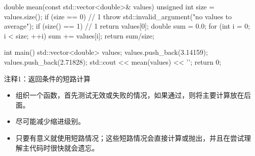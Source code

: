 
\begin{cpp}
double mean(const std::vector<double>& values) {
  unsigned int size = values.size();
  if (size == 0) // 1
    throw std::invalid_argument("no values to average");
  if (size() == 1) // 1
    return values[0];
  double sum = 0.0;
  for (int i = 0; i < size; ++i)
    sum += values[i];
  return sum/size;
}

int main() {
  std::vector<double> values;
  values.push_back(3.14159);
  values.push_back(2.71828);
  std::cout << mean(values) << '\n';
  return 0;
}
\end{cpp}

{\footnotesize
注释1：返回条件的短路计算
}


\begin{itemize}
\item
组织一个函数，首先测试无效或失败的情况，如果通过，则将主要计算放在后面。

\item
尽可能减少缩进级别。

\item
只要有意义就使用短路情况；这些短路情况会直接计算或抛出，并且在尝试理解主代码时很快就会遗忘。
\end{itemize}







